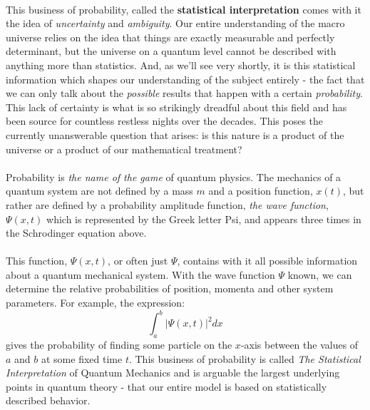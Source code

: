 \documentclass[12pt,letterpaper]{book}
\begin{document}
\paragraph*{}This business of probability, called the \textbf{statistical interpretation} comes with it the idea of \textit{uncertainty} and \textit{ambiguity}. Our entire understanding of the macro universe relies on the idea that things are exactly measurable and perfectly determinant, but the universe on a quantum level cannot be described with anything more than statistics. And, as we'll see very shortly, it is this statistical information which shapes our understanding of the subject entirely - the fact that we can only talk about the \textit{possible} results that happen with a certain \textit{probability}. This lack of certainty is what is so strikingly dreadful about this field and has been source for countless restless nights over the decades. This poses the currently unanswerable question that arises: is this nature is a product of the universe or a product of our mathematical treatment? 
\paragraph*{}Probability is \textit{the name of the game} of quantum physics. The mechanics of a quantum system are not defined by a mass $m$ and a position function, $x(t)$, but rather are defined by a probability amplitude function, \textit{the wave function}, $\Psi(x,t)$ which is represented by the Greek letter Psi, and appears three times in the Schrodinger equation above.
\paragraph*{}This function, $\Psi(x,t)$, or often just $\Psi$, contains with it all possible information about a quantum mechanical system. With the wave function $\Psi$ known, we can determine the relative probabilities of position, momenta and other system parameters. For example, the expression:
\begin{equation}
\label{prob_ab}
\int_a^b \big | \Psi(x,t) \big|^2 dx
\end{equation}
gives the probability of finding some particle on the $x$-axis between the values of $a$ and $b$ at some fixed time $t$. This business of probability is called \textit{The Statistical Interpretation} of Quantum Mechanics and is arguable the largest underlying points in quantum theory - that our entire model is based on statistically described behavior.
\end{document}
